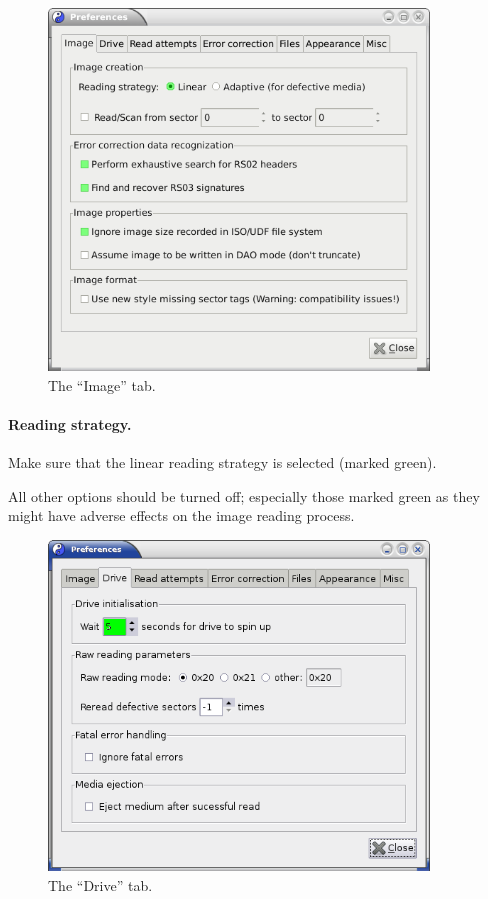 \begin{figure}[h]
\centerline{\includegraphics[width=0.9\textwidth]{screenshots/eccfile-prefs-image.png}}
\caption{The ``Image'' tab.}  
\label{howto-eccfile-prefs-image}
\end{figure}

\paragraph{Reading strategy.} Make sure that the linear reading strategy is selected
(marked green).

\bigskip

All other options should be turned off; especially those marked green as they
might have adverse effects on the image reading process. 

\newpage

\begin{figure}[h]
\centerline{\includegraphics[width=0.9\textwidth]{screenshots/eccfile-prefs-drive.png}}
\caption{The ``Drive'' tab.}  
\label{howto-eccfile-prefs-drive}
\end{figure}

